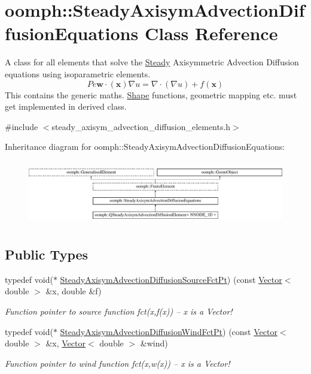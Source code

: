 \hypertarget{classoomph_1_1SteadyAxisymAdvectionDiffusionEquations}{}\section{oomph\+:\+:Steady\+Axisym\+Advection\+Diffusion\+Equations Class Reference}
\label{classoomph_1_1SteadyAxisymAdvectionDiffusionEquations}


A class for all elements that solve the \hyperlink{classoomph_1_1Steady}{Steady} Axisymmetric Advection Diffusion equations using isoparametric elements. \[ Pe \mathbf{w}\cdot(\mathbf{x}) \nabla u = \nabla \cdot \left( \nabla u \right) + f(\mathbf{x}) \] This contains the generic maths. \hyperlink{classoomph_1_1Shape}{Shape} functions, geometric mapping etc. must get implemented in derived class.  




{\ttfamily \#include $<$steady\+\_\+axisym\+\_\+advection\+\_\+diffusion\+\_\+elements.\+h$>$}

Inheritance diagram for oomph\+:\+:Steady\+Axisym\+Advection\+Diffusion\+Equations\+:\begin{figure}[H]
\begin{center}
\leavevmode
\includegraphics[height=2.835443cm]{classoomph_1_1SteadyAxisymAdvectionDiffusionEquations}
\end{center}
\end{figure}
\subsection*{Public Types}
\begin{DoxyCompactItemize}
\item 
typedef void($\ast$ \hyperlink{classoomph_1_1SteadyAxisymAdvectionDiffusionEquations_a1a8121ed2ce92dc69aa85c71975489d0}{Steady\+Axisym\+Advection\+Diffusion\+Source\+Fct\+Pt}) (const \hyperlink{classoomph_1_1Vector}{Vector}$<$ double $>$ \&x, double \&f)
\begin{DoxyCompactList}\small\item\em Function pointer to source function fct(x,f(x)) -- x is a Vector! \end{DoxyCompactList}\item 
typedef void($\ast$ \hyperlink{classoomph_1_1SteadyAxisymAdvectionDiffusionEquations_af8fad98c36589cff579a35bd32641b25}{Steady\+Axisym\+Advection\+Diffusion\+Wind\+Fct\+Pt}) (const \hyperlink{classoomph_1_1Vector}{Vector}$<$ double $>$ \&x, \hyperlink{classoomph_1_1Vector}{Vector}$<$ double $>$ \&wind)
\begin{DoxyCompactList}\small\item\em Function pointer to wind function fct(x,w(x)) -- x is a Vector! \end{DoxyCompactList}\end{DoxyCompactItemize}
